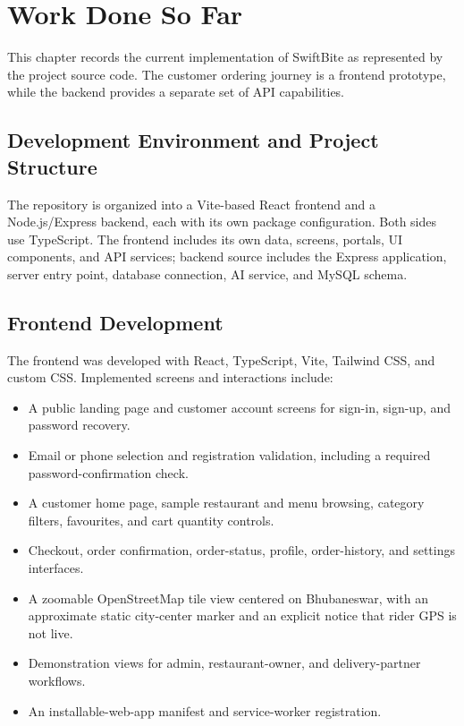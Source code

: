 \chapter{Work Done So Far}

This chapter records the current implementation of SwiftBite as represented by the project source code. The customer ordering journey is a frontend prototype, while the backend provides a separate set of API capabilities.

\section{Development Environment and Project Structure}

The repository is organized into a Vite-based React frontend and a Node.js/Express backend, each with its own package configuration. Both sides use TypeScript. The frontend includes its own data, screens, portals, UI components, and API services; backend source includes the Express application, server entry point, database connection, AI service, and MySQL schema.

\section{Frontend Development}

The frontend was developed with React, TypeScript, Vite, Tailwind CSS, and custom CSS. Implemented screens and interactions include:

\begin{itemize}
\item A public landing page and customer account screens for sign-in, sign-up, and password recovery.
\item Email or phone selection and registration validation, including a required password-confirmation check.
\item A customer home page, sample restaurant and menu browsing, category filters, favourites, and cart quantity controls.
\item Checkout, order confirmation, order-status, profile, order-history, and settings interfaces.
\item A zoomable OpenStreetMap tile view centered on Bhubaneswar, with an approximate static city-center marker and an explicit notice that rider GPS is not live.
\item Demonstration views for admin, restaurant-owner, and delivery-partner workflows.
\item An installable-web-app manifest and service-worker registration.
\end{itemize}

